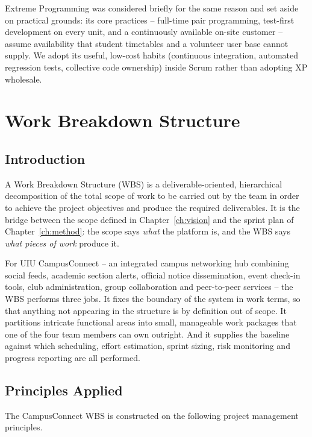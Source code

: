 \documentclass[11pt,a4paper]{report}
\begin{document}
Extreme Programming was considered briefly for the same reason and set aside on
practical grounds: its core practices -- full-time pair programming,
test-first development on every unit, and a continuously available on-site
customer -- assume availability that student timetables and a volunteer user base
cannot supply. We adopt its useful, low-cost habits (continuous integration,
automated regression tests, collective code ownership) inside Scrum rather than
adopting XP wholesale.
\chapter{Work Breakdown Structure}
\label{ch:wbs}

\section{Introduction}

A Work Breakdown Structure (WBS) is a deliverable-oriented, hierarchical
decomposition of the total scope of work to be carried out by the team in order
to achieve the project objectives and produce the required deliverables. It is
the bridge between the scope defined in Chapter~\ref{ch:vision} and the sprint
plan of Chapter~\ref{ch:method}: the scope says \emph{what} the platform is, and
the WBS says \emph{what pieces of work} produce it.

For UIU CampusConnect -- an integrated campus networking hub combining social
feeds, academic section alerts, official notice dissemination, event check-in
tools, club administration, group collaboration and peer-to-peer services -- the
WBS performs three jobs. It fixes the boundary of the system in work terms, so
that anything not appearing in the structure is by definition out of scope. It
partitions intricate functional areas into small, manageable work packages that
one of the four team members can own outright. And it supplies the baseline
against which scheduling, effort estimation, sprint sizing, risk monitoring and
progress reporting are all performed.

\section{Principles Applied}

The CampusConnect WBS is constructed on the following project management
principles.
\end{document}
